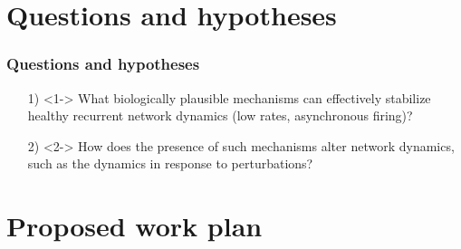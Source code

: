 \documentclass[8pt,t,usepdftitle=false]{beamer}
\begin{document}
\def\ttl{Questions and hypotheses}\section{\ttl}
\begin{frame}[t,plain]
  \frametitle{\ttl}
  \begin{enumerate}\itemsep2ex
  \item[1)]<1-> What biologically plausible mechanisms can effectively stabilize healthy recurrent network dynamics (low rates, asynchronous firing)?
  \item[2)]<2-> How does the presence of such mechanisms alter network dynamics, such as the dynamics in response to perturbations?
  \end{enumerate}
\end{frame}
\def\ttl{Proposed work plan}\section{\ttl}
\end{document}
